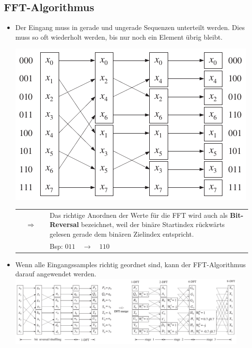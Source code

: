 	\subsection{FFT-Algorithmus}
		\begin{itemize}
		 \item Der Eingang muss in gerade und ungerade Sequenzen unterteilt werden. Dies muss so oft wiederholt werden, bis nur noch ein Element übrig bleibt.\\[0.1cm]
		 \begin{minipage}{0.4\textwidth}
			\includegraphics[width = \textwidth]{pic/andrdnungfuerFFT.pdf}
		 \end{minipage}
		 \begin{minipage}{0.55\textwidth}
			\begin{tabularx}{\textwidth}{llX}
				&$\Rightarrow\quad$ & Das richtige Anordnen der Werte für die FFT wird auch als \textbf{Bit-Reversal} bezeichnet, weil der binäre Startindex rückwärts gelesen gerade dem binären Zielindex entspricht.\\
				&&Bsp: $011\quad\rightarrow\quad 110$\\
			\end{tabularx}			
		 \end{minipage}
		 \item Wenn alle Eingangssamples richtig geordnet sind, kann der FFT-Algorithmus darauf angewendet werden.\\[0.1cm]
		 \includegraphics[width = 0.95\textwidth]{pic/FFTAlg.pdf}
		\end{itemize}

